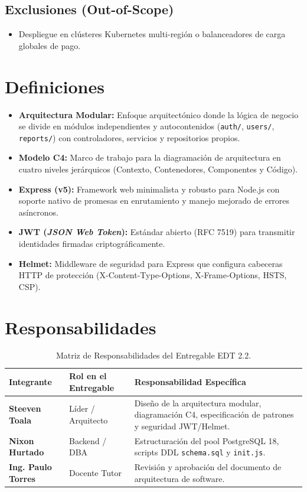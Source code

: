 \documentclass[11pt,a4paper]{article}
\begin{document}
\subsection{Exclusiones (Out-of-Scope)}
\begin{itemize}[leftmargin=1.5em, itemsep=2pt]
    \item Despliegue en clústeres Kubernetes multi-región o balanceadores de carga globales de pago.
\end{itemize}

\section{Definiciones}
\begin{itemize}[leftmargin=1.5em, itemsep=2pt]
    \item \textbf{Arquitectura Modular:} Enfoque arquitectónico donde la lógica de negocio se divide en módulos independientes y autocontenidos (\texttt{auth/}, \texttt{users/}, \texttt{reports/}) con controladores, servicios y repositorios propios.
    \item \textbf{Modelo C4:} Marco de trabajo para la diagramación de arquitectura en cuatro niveles jerárquicos (Contexto, Contenedores, Componentes y Código).
    \item \textbf{Express (v5):} Framework web minimalista y robusto para Node.js con soporte nativo de promesas en enrutamiento y manejo mejorado de errores asíncronos.
    \item \textbf{JWT (\textit{JSON Web Token}):} Estándar abierto (RFC 7519) para transmitir identidades firmadas criptográficamente.
    \item \textbf{Helmet:} Middleware de seguridad para Express que configura cabeceras HTTP de protección (X-Content-Type-Options, X-Frame-Options, HSTS, CSP).
\end{itemize}

\section{Responsabilidades}
\begin{table}[htbp]
\centering
\small
\begin{tabularx}{\textwidth}{|>{\hsize=0.65\hsize\bfseries}X|>{\hsize=0.85\hsize}X|>{\hsize=1.5\hsize}X|}
    \hline
    \rowcolor{tableheader}
    Integrante & Rol en el Entregable & Responsabilidad Específica \\
    \hline
    Steeven Toala & Líder / Arquitecto & Diseño de la arquitectura modular, diagramación C4, especificación de patrones y seguridad JWT/Helmet. \\
    \hline
    Nixon Hurtado & Backend / DBA & Estructuración del pool PostgreSQL 18, scripts DDL \texttt{schema.sql} y \texttt{init.js}. \\
    \hline
    Ing. Paulo Torres & Docente Tutor & Revisión y aprobación del documento de arquitectura de software. \\
    \hline
\end{tabularx}
\caption{Matriz de Responsabilidades del Entregable EDT 2.2.}
\end{table}
\end{document}
